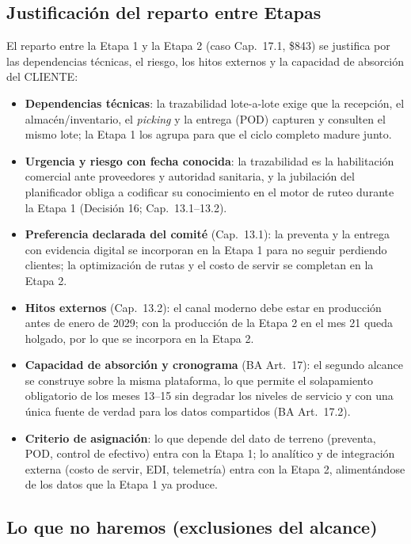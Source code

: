 \subsection{Justificación del reparto entre Etapas}

El reparto entre la Etapa 1 y la Etapa 2 (caso Cap.\ 17.1, \$843) se justifica por las dependencias técnicas, el riesgo, los hitos externos y la capacidad de absorción del CLIENTE:

\begin{itemize}
  \item \textbf{Dependencias técnicas}: la trazabilidad lote-a-lote exige que la recepción, el almacén/inventario, el \emph{picking} y la entrega (POD) capturen y consulten el mismo lote; la Etapa 1 los agrupa para que el ciclo completo madure junto.
  \item \textbf{Urgencia y riesgo con fecha conocida}: la trazabilidad es la habilitación comercial ante proveedores y autoridad sanitaria, y la jubilación del planificador obliga a codificar su conocimiento en el motor de ruteo durante la Etapa 1 (Decisión 16; Cap.\ 13.1--13.2).
  \item \textbf{Preferencia declarada del comité} (Cap.\ 13.1): la preventa y la entrega con evidencia digital se incorporan en la Etapa 1 para no seguir perdiendo clientes; la optimización de rutas y el costo de servir se completan en la Etapa 2.
  \item \textbf{Hitos externos} (Cap.\ 13.2): el canal moderno debe estar en producción antes de enero de 2029; con la producción de la Etapa 2 en el mes 21 queda holgado, por lo que se incorpora en la Etapa 2.
  \item \textbf{Capacidad de absorción y cronograma} (BA Art.\ 17): el segundo alcance se construye sobre la misma plataforma, lo que permite el solapamiento obligatorio de los meses 13--15 sin degradar los niveles de servicio y con una única fuente de verdad para los datos compartidos (BA Art.\ 17.2).
  \item \textbf{Criterio de asignación}: lo que depende del dato de terreno (preventa, POD, control de efectivo) entra con la Etapa 1; lo analítico y de integración externa (costo de servir, EDI, telemetría) entra con la Etapa 2, alimentándose de los datos que la Etapa 1 ya produce.
\end{itemize}

\subsection{Lo que no haremos (exclusiones del alcance)}


